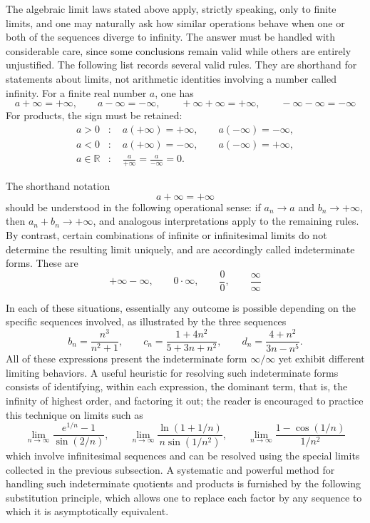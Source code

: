 The algebraic limit laws stated above apply, strictly speaking, only to finite limits, and one may naturally ask
how similar operations behave when one or both of the sequences diverge to infinity. The answer must be handled
with considerable care, since some conclusions remain valid while others are entirely unjustified. The following
list records several valid rules. They are shorthand for statements about
limits, not arithmetic identities involving a number called infinity. For
a finite real number $a$, one has
\[
a + \infty = +\infty, \qquad a - \infty = -\infty, \qquad +\infty + \infty = +\infty, \qquad -\infty - \infty = -\infty
\]
For products, the sign must be retained:
\[
\begin{aligned}
a>0 &: \quad a(+\infty)=+\infty,\qquad a(-\infty)=-\infty,\\
a<0 &: \quad a(+\infty)=-\infty,\qquad a(-\infty)=+\infty,\\
a\in\mathbb{R} &: \quad \frac{a}{+\infty}
=\frac{a}{-\infty}=0.
\end{aligned}
\]

The shorthand notation
\[
a + \infty = +\infty
\]
 should be understood in the following operational sense: if
$a_n \to a$ and $b_n \to +\infty$, then $a_n + b_n \to +\infty$, and analogous interpretations apply to the
remaining rules. By contrast, certain combinations of infinite or infinitesimal limits do not determine the
resulting limit uniquely, and are accordingly called indeterminate forms. These are
\[
+\infty - \infty, \qquad 0 \cdot \infty, \qquad \frac{0}{0}, \qquad \frac{\infty}{\infty}
\]

In each of these situations, essentially any outcome is possible depending on the specific sequences involved,
as illustrated by the three sequences
\[
b_n = \frac{n^3}{n^2 + 1}, \qquad c_n = \frac{1 + 4n^2}{5 + 3n + n^2}, \qquad d_n = \frac{4 + n^2}{3n - n^5}.
\]
All of these expressions present the indeterminate form $\infty / \infty$ yet exhibit different limiting behaviors.
A useful heuristic for resolving such indeterminate forms consists of identifying, within each expression, the
dominant term, that is, the infinity of highest order, and factoring it out; the reader is encouraged to practice
this technique on limits such as
\[
\lim_{n \to \infty} \frac{e^{1/n} - 1}{\sin(2/n)}, \qquad
\lim_{n \to \infty} \frac{\ln(1 + 1/n)}{n \sin(1/n^2)}, \qquad
\lim_{n \to \infty} \frac{1 - \cos(1/n)}{1/n^2}
\]
which involve infinitesimal sequences and can be resolved using the special limits collected in the previous
subsection. A systematic and powerful method for handling such indeterminate quotients and products is furnished
by the following substitution principle, which allows one to replace each factor by any sequence to which it is
asymptotically equivalent.

